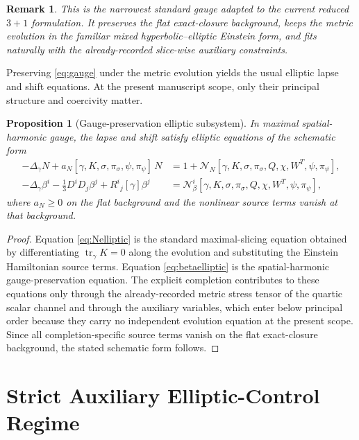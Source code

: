 \documentclass[11pt]{article}
\newtheorem{proposition}{Proposition}
\newtheorem{remark}{Remark}
\begin{document}
\begin{remark}
This is the narrowest standard gauge adapted to the current reduced \(3+1\) formulation. It preserves the flat exact-closure background, keeps the metric evolution in the familiar mixed hyperbolic--elliptic Einstein form, and fits naturally with the already-recorded slice-wise auxiliary constraints.
\end{remark}

Preserving \eqref{eq:gauge} under the metric evolution yields the usual elliptic lapse and shift equations. At the present manuscript scope, only their principal structure and coercivity matter.

\begin{proposition}[Gauge-preservation elliptic subsystem]
In maximal spatial-harmonic gauge, the lapse and shift satisfy elliptic equations of the schematic form
\begin{align}
-\Delta_\gamma N + a_N[\gamma,K,\sigma,\pi_\sigma,\psi,\pi_\psi]\,N
&=
1+\mathcal N_N[\gamma,K,\sigma,\pi_\sigma,Q,\chi,W^T,\psi,\pi_\psi],
\label{eq:Nelliptic}
\\
-\Delta_\gamma\beta^i-\frac{1}{3}D^iD_j\beta^j
+R^i{}_j[\gamma]\beta^j
&=
\mathcal N_\beta^i[\gamma,K,\sigma,\pi_\sigma,Q,\chi,W^T,\psi,\pi_\psi],
\label{eq:betaelliptic}
\end{align}
where \(a_N\ge 0\) on the flat background and the nonlinear source terms vanish at that background.
\end{proposition}

\begin{proof}
Equation \eqref{eq:Nelliptic} is the standard maximal-slicing equation obtained by differentiating \(\operatorname{tr}_\gamma K=0\) along the evolution and substituting the Einstein Hamiltonian source terms. Equation \eqref{eq:betaelliptic} is the spatial-harmonic gauge-preservation equation. The explicit completion contributes to these equations only through the already-recorded metric stress tensor of the quartic scalar channel and through the auxiliary variables, which enter below principal order because they carry no independent evolution equation at the present scope. Since all completion-specific source terms vanish on the flat exact-closure background, the stated schematic form follows.
\end{proof}

\section{Strict Auxiliary Elliptic-Control Regime}
\end{document}
